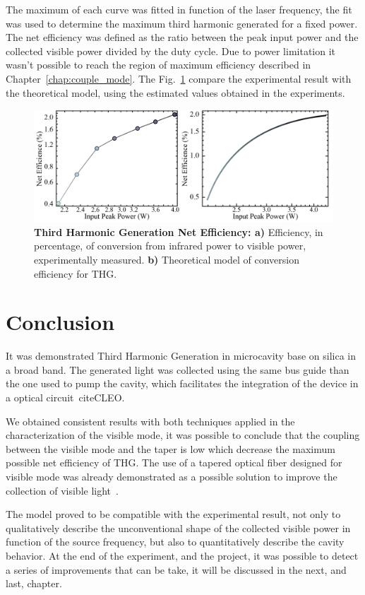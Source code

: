 The maximum of each curve was fitted in function of the laser frequency, the fit was used to determine the maximum third harmonic generated for a fixed power. The net efficiency was defined as the ratio between the peak input power and the collected visible power divided by the duty cycle. Due to power limitation it wasn't possible to reach the region of maximum efficiency described in Chapter~\ref{chap:couple_mode}. The Fig.~\ref{fig:net_eff} compare the experimental result with the theoretical model, using the estimated values obtained in the experiments. 
\begin{figure}[h]
    \centering
    \includegraphics[width = 16cm]{figuras/Dissertation_net_eff.jpg}
    \caption{\textbf{Third Harmonic Generation Net Efficiency: a)} Efficiency, in percentage, of conversion from infrared power to visible power, experimentally measured. \textbf{b)} Theoretical model of conversion efficiency for THG.}
    \label{fig:net_eff}
\end{figure}

\section{Conclusion}

It was demonstrated Third Harmonic Generation in microcavity base on silica in a broad band. The generated light was collected using the same bus guide than the one used to pump the cavity, which facilitates the integration of the device in a optical circuit~citeCLEO.

We obtained consistent results with both techniques applied in the characterization of the visible mode, it was possible to conclude that the coupling between the visible mode and the taper is low which decrease the maximum possible net efficiency of THG. The use of a tapered optical fiber designed for visible mode was already demonstrated as a possible solution to improve the collection of visible light~\needcit.

The model proved to be compatible with the experimental result, not only to qualitatively describe the unconventional shape of the collected visible power in function of the source frequency, but also to quantitatively describe the cavity behavior. At the end of the experiment, and the project, it was possible to detect a series of improvements that can be take, it will be discussed in the next, and last, chapter.

